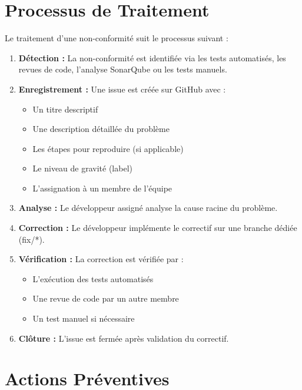 \documentclass[12pt,a4paper]{report}
\begin{document}
\section{Processus de Traitement}

Le traitement d'une non-conformité suit le processus suivant :

\begin{enumerate}
    \item \textbf{Détection :} La non-conformité est identifiée via les tests automatisés, les revues de code, l'analyse SonarQube ou les tests manuels.
    
    \item \textbf{Enregistrement :} Une issue est créée sur GitHub avec :
    \begin{itemize}
        \item Un titre descriptif
        \item Une description détaillée du problème
        \item Les étapes pour reproduire (si applicable)
        \item Le niveau de gravité (label)
        \item L'assignation à un membre de l'équipe
    \end{itemize}
    
    \item \textbf{Analyse :} Le développeur assigné analyse la cause racine du problème.
    
    \item \textbf{Correction :} Le développeur implémente le correctif sur une branche dédiée (fix/*).
    
    \item \textbf{Vérification :} La correction est vérifiée par :
    \begin{itemize}
        \item L'exécution des tests automatisés
        \item Une revue de code par un autre membre
        \item Un test manuel si nécessaire
    \end{itemize}
    
    \item \textbf{Clôture :} L'issue est fermée après validation du correctif.
\end{enumerate}

\section{Actions Préventives}
\end{document}
